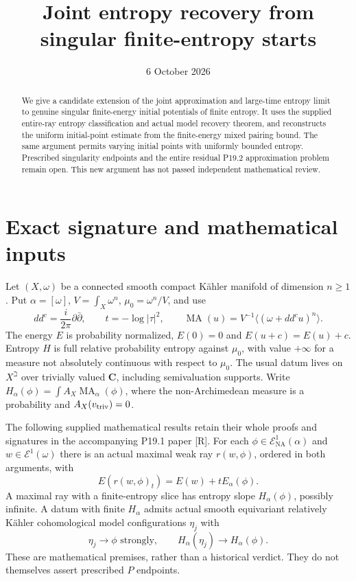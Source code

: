 \documentclass[11pt]{article}
\title{Joint entropy recovery from singular finite-entropy starts}
\author{}
\date{6 October 2026}
\newcommand{\MA}{\operatorname{MA}}
\newcommand{\NA}{\mathrm{NA}}
\newcommand{\Eone}{\mathcal E^1}
\begin{document}
\maketitle
\begin{abstract}
We give a candidate extension of the joint approximation and large-time
entropy limit to genuine singular finite-energy initial potentials of
finite entropy. It uses the supplied entire-ray entropy classification
and actual model recovery theorem, and reconstructs the uniform
initial-point estimate from the finite-energy mixed pairing bound.
The same argument permits varying initial points with uniformly bounded
entropy. Prescribed singularity endpoints and the entire residual
P19.2 approximation problem remain open. This new argument has not
passed independent mathematical review.
\end{abstract}

\section{Exact signature and mathematical inputs}
Let $(X,\omega)$ be a connected smooth compact K\"ahler manifold of
dimension $n\geq1$. Put $\alpha=[\omega]$, $V=\int_X\omega^n$,
$\mu_0=\omega^n/V$, and use
\[
 dd^c=\frac{i}{2\pi}\partial\bar\partial,
 \qquad t=-\log|\tau|^2,\qquad
 \MA(u)=V^{-1}\langle(\omega+dd^cu)^n\rangle .             \tag{1}
\]
The energy $E$ is probability normalized, $E(0)=0$ and
$E(u+c)=E(u)+c$. Entropy $H$ is full relative probability entropy
against $\mu_0$, with value $+\infty$ for a measure not absolutely
continuous with respect to $\mu_0$.
The usual datum lives on $X^\beth$ over trivially valued
$\mathbf C$, including semivaluation supports. Write
$H_\alpha(\phi)=\int A_X\MA_\alpha(\phi)$, where the
non-Archimedean measure is a probability and $A_X(v_{\rm triv})=0$.

The following supplied mathematical results retain their whole proofs
and signatures in the accompanying P19.1 paper [R]. For each
$\phi\in\Eone_\NA(\alpha)$ and $w\in\Eone(\omega)$ there is an
actual maximal weak ray $r(w,\phi)$, ordered in both arguments, with
\[
 E(r(w,\phi)_t)=E(w)+tE_\alpha(\phi).                    \tag{2}
\]
A maximal ray with a finite-entropy slice has entropy slope
$H_\alpha(\phi)$, possibly infinite. A datum with finite
$H_\alpha$ admits actual smooth equivariant relatively K\"ahler
cohomological model configurations $\eta_j$ with
\[
 \eta_j\longrightarrow\phi\text{ strongly},\qquad
 H_\alpha(\eta_j)\longrightarrow H_\alpha(\phi).          \tag{3}
\]
These are mathematical premises, rather than a historical verdict.
They do not themselves assert prescribed $P$ endpoints.
\end{document}

